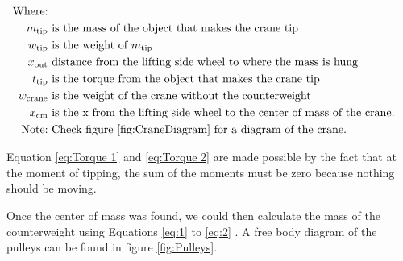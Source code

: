 \documentclass[letterpaper, 12pt]{article}
\begin{document}
\begin{equation}
    \begin{split}
        \text{Where:} \\
        m_{\text{tip}} & \text{ is the mass of the object that makes the crane tip} \\
        w_{\text{tip}} & \text{ is the weight of } m_{\text{tip}} \\
        x_{\text{out}} & \text{ distance from the lifting side wheel to where the mass is hung} \\
        t_{\text{tip}} & \text{ is the torque from the object that makes the crane tip} \\
        w_{\text{crane}} & \text{ is the weight of the crane without the counterweight} \\
        x_{\text{cm}} & \text{ is the x from the lifting side wheel to the center of mass of the crane.} \\
        \text{Note:} & \text{ Check figure \ref{fig:CraneDiagram} for a diagram of the crane.}
    \end{split}
\end{equation}



Equation \ref{eq:Torque 1} and \ref{eq:Torque 2} are made possible by the fact that at the moment of tipping, the sum of the moments must be zero because nothing should be moving. 

Once the center of mass was found, we could then calculate the mass of the counterweight using Equations \ref{eq:1} to \ref{eq:2} . A free body diagram of the pulleys can be found in figure \ref{fig:Pulleys}. 
\end{document}
